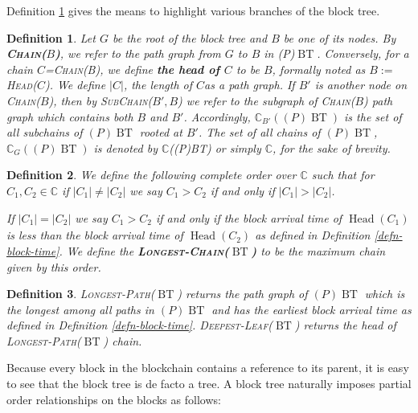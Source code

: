 \documentclass{book}
\newcommand{\assign}{:=}
\newcommand{\tmname}[1]{\textsc{#1}}
\newcommand{\tmop}[1]{\ensuremath{\operatorname{#1}}}
\newcommand{\tmstrong}[1]{\textbf{#1}}
\newcommand{\tmtextbf}[1]{{\bfseries{#1}}}
\newcommand{\tmtextsc}[1]{{\scshape{#1}}}
\newtheorem{definition}{Definition}
\providecommand{\tmname}[1]{\tmtextsc{#1}}
\providecommand{\tmop}[1]{\ensuremath{\mathrm{#1}}}
\providecommand{\tmstrong}[1]{\tmtextbf{#1}}
\providecommand{\tmtextbf}[1]{\tmtextbf{#1}}
\newtheorem{definition}{Definition}
\begin{document}
Definition \ref{defn-chain-subchain} gives the means to highlight various
branches of the block tree.

\begin{definition}
  \label{defn-chain-subchain}Let $G$ be the root of the block tree and $B$ be
  one of its nodes. By {\tmname{{\tmstrong{Chain($B$)}},}} we refer to the
  path graph from $G$ to $B$ in (P)$\tmop{BT}$. Conversely, for a chain
  $C$={\tmname{Chain(B)}}, we define {\tmstrong{the head of $C$}} to be $B$,
  formally noted as $B \assign${\tmname{Head($C$)}}. We define $| C |$, the
  length of $C$as a path graph. If $B'$ is another node on
  {\tmname{Chain($B$)}}, then by {\tmname{SubChain($B', B$)}} we refer to the
  subgraph of {\tmname{Chain($B$)}} path graph which contains both $B$ and
  $B'$. Accordingly, $\mathbb{C}_{B'} ((P) \tmop{BT})$ is the set of all
  subchains of $(P) \tmop{BT}$ rooted at $B'$. The set of all chains of $(P)
  \tmop{BT}$, $\mathbb{C}_G ((P) \tmop{BT})$ is denoted by $\mathbb{C}$((P)BT)
  or simply $\mathbb{C}$, for the sake of brevity.
\end{definition}

\begin{definition}
  \label{defn-longest-chain}We define the following complete order over
  $\mathbb{C}$ such that for $C_1, C_2 \in \mathbb{C}$ if $| C_1 | \neq | C_2
  |$ we say $C_1 > C_2$ if and only if $| C_1 | > | C_2 |$.
  
  If $| C_1 | = | C_2 |$ we say $C_1 > C_2$ if and only if the block arrival
  time of $\tmop{Head} (C_1)_{}$ is less than the block arrival time of
  $\tmop{Head} (C_2)$ as defined in Definition \ref{defn-block-time}. We
  define the {\tmstrong{{\tmname{Longest-Chain($\tmop{BT}$)}}}} to be the
  maximum chain given by this order.
\end{definition}

\begin{definition}
  {\tmname{Longest-Path($\tmop{BT}$)}} returns the path graph of $(P)
  \tmop{BT}$ which is the longest among all paths in $(P) \tmop{BT}$ and has
  the earliest block arrival time as defined in Definition
  \ref{defn-block-time}. {\tmname{Deepest-Leaf($\tmop{BT}$)}} returns the head
  of {\tmname{Longest-Path($\tmop{BT}$)}} chain.
\end{definition}

Because every block in the blockchain contains a reference to its parent, it
is easy to see that the block tree is de facto a tree. A block tree naturally
imposes partial order relationships on the blocks as follows:
\end{document}
